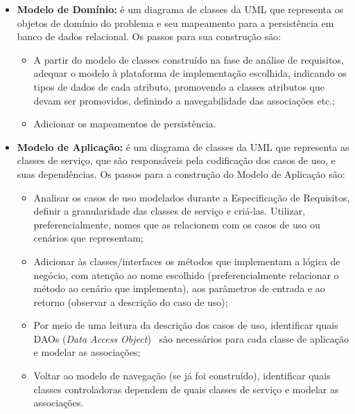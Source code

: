 \begin{itemize}
	\item \textbf{Modelo de Domínio:} é um diagrama de classes da UML que representa os objetos de domínio do problema e seu mapeamento para a persistência em banco de dados relacional. Os passos para sua construção são:
	
	\begin{itemize}
		\item A partir do modelo de classes construído na fase de análise de requisitos, adequar o modelo à plataforma de implementação escolhida, indicando os tipos de dados de cada atributo, promovendo a classes atributos que devam ser promovidos, definindo a navegabilidade das associações etc.;
		\item Adicionar os mapeamentos de persistência.	
	
	\end{itemize}
	
	\item \textbf{Modelo de Aplicação:} é um diagrama de classes da UML que representa as classes de serviço, que são responsáveis pela codificação dos casos de uso, e suas dependências. Os passos para a construção do Modelo de Aplicação são:	
	\begin{itemize}
		\item Analisar os casos de uso modelados durante a Especificação de Requisitos, definir a granularidade das classes de serviço e criá-las. Utilizar, preferencialmente, nomes que as relacionem com os casos de uso ou cenários que representam;
	
		\item Adicionar às classes/interfaces os métodos que implementam a lógica de negócio, com atenção ao nome escolhido (preferencialmente relacionar o método ao cenário que implementa), aos parâmetros de entrada e ao retorno (observar a descrição do caso de uso);
	
		\item Por meio de uma leitura da descrição dos casos de uso, identificar quais DAOs (\textit{Data Access Object})~\cite{alurDAO} são necessários para cada classe de aplicação e modelar as associações;
	
		\item Voltar ao modelo de navegação (se já foi construído), identificar quais classes controladoras dependem de quais classes de serviço e modelar as associações.
	\end{itemize}
	

\end{itemize}
